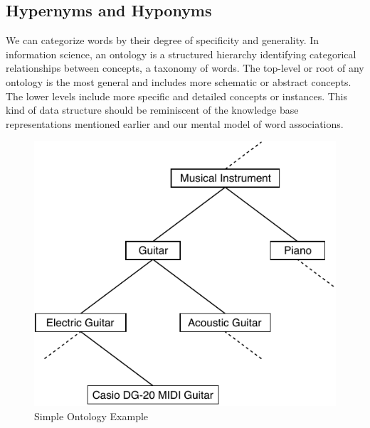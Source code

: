 \subsection{Hypernyms and Hyponyms}

We can categorize words by their degree of specificity and generality. In information science, an ontology is a structured hierarchy identifying categorical relationships between concepts, a taxonomy of words. The top-level or root of any ontology is the most general and includes more schematic or abstract concepts. The lower levels include more specific and detailed concepts or instances. This kind of data structure should be reminiscent of the knowledge base representations mentioned earlier and our mental model of word associations.


\begin{figure}[h]
    \includegraphics[width=0.8\linewidth, left]{graphics/level_of_specificity.pdf}
  \caption{Simple Ontology Example}
  \label{fig:ontology}
\end{figure}

